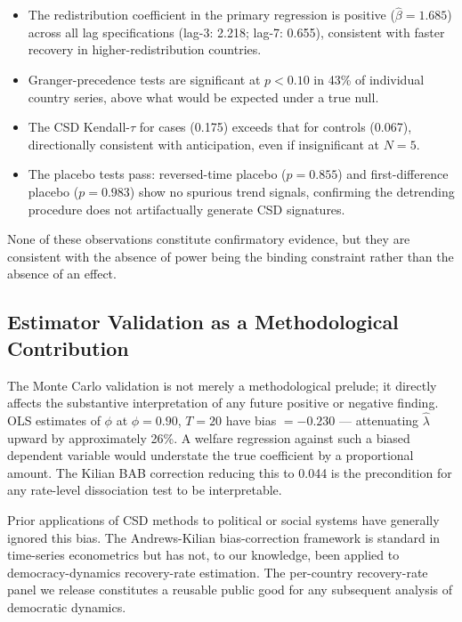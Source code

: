 \documentclass[11pt,letterpaper]{article}
\begin{document}
\begin{itemize}
  \item The redistribution coefficient in the primary regression is positive ($\hat{\beta} = 1.685$) across all lag
    specifications (lag-3: 2.218; lag-7: 0.655), consistent with faster recovery in higher-redistribution countries.
  \item Granger-precedence tests are significant at $p < 0.10$ in 43\% of individual country series, above what would
    be expected under a true null.
  \item The CSD Kendall-$\tau$ for cases (0.175) exceeds that for controls (0.067), directionally consistent with
    anticipation, even if insignificant at $N = 5$.
  \item The placebo tests pass: reversed-time placebo ($p = 0.855$) and first-difference placebo ($p = 0.983$) show no
    spurious trend signals, confirming the detrending procedure does not artifactually generate CSD signatures.
\end{itemize}

None of these observations constitute confirmatory evidence, but they are consistent with the absence of power being the
binding constraint rather than the absence of an effect.

\subsection{Estimator Validation as a Methodological Contribution}

The Monte Carlo validation is not merely a methodological prelude; it directly affects the substantive interpretation
of any future positive or negative finding. OLS estimates of $\phi$ at $\phi = 0.90$, $T = 20$ have bias $= -0.230$ ---
attenuating $\hat{\lambda}$ upward by approximately 26\%. A welfare regression against such a biased dependent variable
would understate the true coefficient by a proportional amount. The Kilian BAB correction reducing this to 0.044 is the
precondition for any rate-level dissociation test to be interpretable.

Prior applications of CSD methods to political or social systems have generally ignored this bias. The Andrews-Kilian
bias-correction framework \citep{Andrews1993,Kilian1998} is standard in time-series econometrics but has not, to our
knowledge, been applied to democracy-dynamics recovery-rate estimation. The per-country recovery-rate panel we release
constitutes a reusable public good for any subsequent analysis of democratic dynamics.
\end{document}
